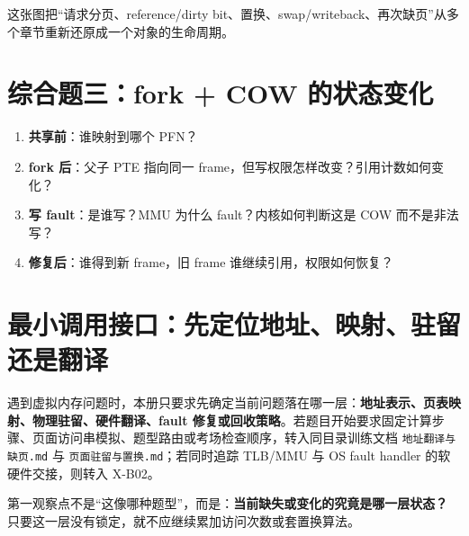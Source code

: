 \documentclass[11pt,a4paper]{ctexart}
\newcommand{\kw}[1]{\textbf{#1}}
\begin{document}
这张图把“请求分页、reference/dirty bit、置换、swap/writeback、再次缺页”从多个章节重新还原成一个对象的生命周期。

\section{综合题三：fork + COW 的状态变化}
\begin{method}
\begin{enumerate}
  \item \kw{共享前}：谁映射到哪个 PFN？
  \item \kw{fork 后}：父子 PTE 指向同一 frame，但写权限怎样改变？引用计数如何变化？
  \item \kw{写 fault}：是谁写？MMU 为什么 fault？内核如何判断这是 COW 而不是非法写？
  \item \kw{修复后}：谁得到新 frame，旧 frame 谁继续引用，权限如何恢复？
\end{enumerate}
\end{method}

\section{最小调用接口：先定位地址、映射、驻留还是翻译}

遇到虚拟内存问题时，本册只要求先确定当前问题落在哪一层：\kw{地址表示、页表映射、物理驻留、硬件翻译、fault 修复或回收策略}。若题目开始要求固定计算步骤、页面访问串模拟、题型路由或考场检查顺序，转入同目录训练文档 \texttt{地址翻译与缺页.md} 与 \texttt{页面驻留与置换.md}；若同时追踪 TLB/MMU 与 OS fault handler 的软硬件交接，则转入 X-B02。

第一观察点不是“这像哪种题型”，而是：\kw{当前缺失或变化的究竟是哪一层状态？} 只要这一层没有锁定，就不应继续累加访问次数或套置换算法。
\end{document}
